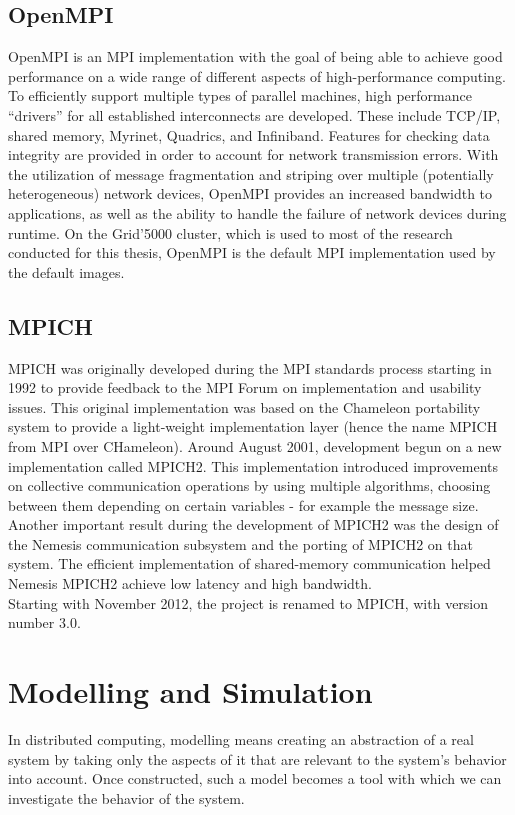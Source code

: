 \subsection{OpenMPI}
OpenMPI is an MPI implementation with the goal of being able to
achieve good performance on a wide range of different aspects of
high-performance computing. To efficiently support multiple types of
parallel machines, high performance “drivers” for all established
interconnects are developed. These include TCP/IP, shared memory,
Myrinet, Quadrics, and Infiniband. Features for checking data
integrity are provided in order to account for network transmission
errors. With the utilization of message fragmentation and striping
over multiple (potentially heterogeneous) network devices, OpenMPI
provides an increased bandwidth to applications, as well as the
ability to handle the failure of network devices during
runtime.\cite{ompi04} On the Grid'5000 cluster, which is used to most
of the research conducted for this thesis, OpenMPI is the default MPI
implementation used by the default images.
\subsection{MPICH}
MPICH was originally developed during the MPI standards process
starting in 1992 to provide feedback to the MPI Forum on
implementation and usability issues. This original implementation was
based on the Chameleon portability system to provide a light-weight
implementation layer (hence the name MPICH from MPI over
CHameleon). Around August 2001, development begun on a new
implementation called MPICH2.\cite{mpich12} This implementation
introduced improvements on collective communication operations by
using multiple algorithms, choosing between them depending on certain
variables - for example the message size.\cite{trg05} Another
important result during the development of MPICH2 was the design of
the Nemesis communication subsystem and the porting of MPICH2 on that
system. The efficient implementation of shared-memory communication
helped Nemesis MPICH2 achieve low latency and high
bandwidth.\cite{bmg07}\\
Starting with November 2012, the project is renamed to MPICH, with
version number 3.0.\cite{mpich12}
\section{Modelling and Simulation}
In distributed computing, modelling means creating an abstraction of a
real system by taking only the aspects of it that are relevant to the
system's behavior into account. Once constructed, such a model becomes
a tool with which we can investigate the behavior of the
system.\cite{h12_1}
